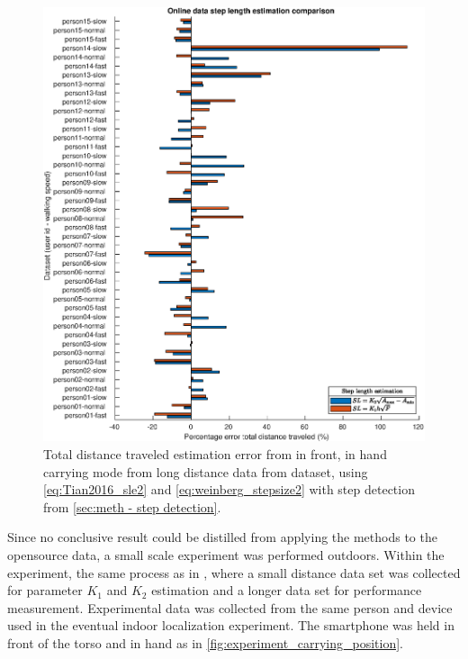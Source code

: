 \begin{figure}[H]
	\centering
	\includegraphics[width=\linewidth]{images/20201128_1403_Online_data_step_length_estimation_comparison}
	\caption{Total distance traveled estimation error from in front, in hand carrying mode from long distance data from \citet{Vezocnik2019} dataset, using \eqref{eq:Tian2016_sle2} and \eqref{eq:weinberg_stepsize2} with step detection from \cref{sec:meth - step detection}. }
	\label{fig:202011131943_wienberg_vs_tian_vezocnik_data1}
\end{figure}
 
Since no conclusive result could be distilled from applying the methods to the opensource data, a small scale experiment was performed outdoors. Within the experiment, the same process as in \cite{Vezocnik2019}, where a small distance data set was collected for parameter $ K_1 $ and $ K_2 $ estimation and a longer data set for performance measurement. Experimental data was collected from the same person and device used in the eventual indoor localization experiment. The smartphone was held in front of the torso and in hand as in \cref{fig:experiment_carrying_position}. \par 

